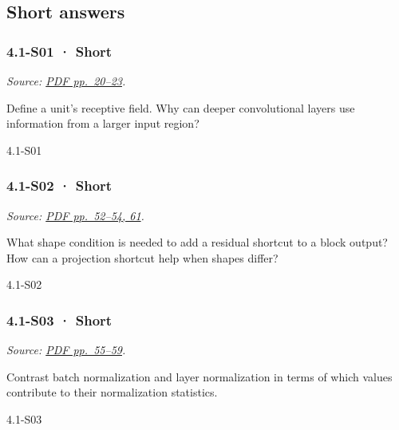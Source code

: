 \subsection{Short answers}\label{short-answers-11}

\noindent\begin{minipage}{\linewidth}

\subsubsection{4.1-S01 · Short}\label{s01-short-11}

\emph{Source: \href{../Lecture\%20Slides/4.1.\%20CNNs.pdf\#page=20}{PDF
pp.~20--23}.}

Define a unit's receptive field. Why can deeper convolutional layers use
information from a larger input region?

\begin{solution}[20mm]{4.1-S01}

\end{solution}
\end{minipage}\par\medskip

\noindent\begin{minipage}{\linewidth}

\subsubsection{4.1-S02 · Short}\label{s02-short-11}

\emph{Source: \href{../Lecture\%20Slides/4.1.\%20CNNs.pdf\#page=52}{PDF
pp.~52--54, 61}.}

What shape condition is needed to add a residual shortcut to a block
output? How can a projection shortcut help when shapes differ?

\begin{solution}[20mm]{4.1-S02}

\end{solution}
\end{minipage}\par\medskip

\noindent\begin{minipage}{\linewidth}

\subsubsection{4.1-S03 · Short}\label{s03-short-11}

\emph{Source: \href{../Lecture\%20Slides/4.1.\%20CNNs.pdf\#page=55}{PDF
pp.~55--59}.}

Contrast batch normalization and layer normalization in terms of which
values contribute to their normalization statistics.

\begin{solution}[20mm]{4.1-S03}

\end{solution}
\end{minipage}\par\medskip

